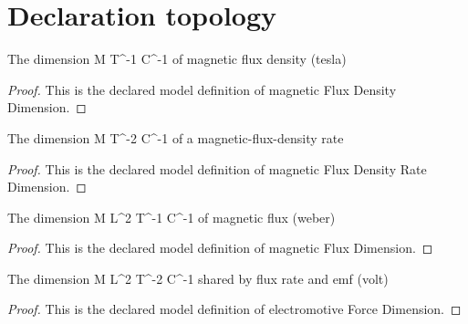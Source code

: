 \section{Declaration topology}
\begin{definition}
  \label{def:physics:phyx-mini-0936:phyxminiproblems-problemphyxmini0936-magneticfluxdensitydimension}
  The dimension M T\textasciicircum{}-1 C\textasciicircum{}-1 of magnetic flux density (tesla)
\end{definition}
\begin{proof}
  This is the declared model definition of magnetic Flux Density Dimension.
\end{proof}
\begin{definition}
  \label{def:physics:phyx-mini-0936:phyxminiproblems-problemphyxmini0936-magneticfluxdensityratedimension}
  The dimension M T\textasciicircum{}-2 C\textasciicircum{}-1 of a magnetic-flux-density rate
\end{definition}
\begin{proof}
  This is the declared model definition of magnetic Flux Density Rate Dimension.
\end{proof}
\begin{definition}
  \label{def:physics:phyx-mini-0936:phyxminiproblems-problemphyxmini0936-magneticfluxdimension}
  The dimension M L\textasciicircum{}2 T\textasciicircum{}-1 C\textasciicircum{}-1 of magnetic flux (weber)
\end{definition}
\begin{proof}
  This is the declared model definition of magnetic Flux Dimension.
\end{proof}
\begin{definition}
  \label{def:physics:phyx-mini-0936:phyxminiproblems-problemphyxmini0936-electromotiveforcedimension}
  The dimension M L\textasciicircum{}2 T\textasciicircum{}-2 C\textasciicircum{}-1 shared by flux rate and emf (volt)
\end{definition}
\begin{proof}
  This is the declared model definition of electromotive Force Dimension.
\end{proof}
